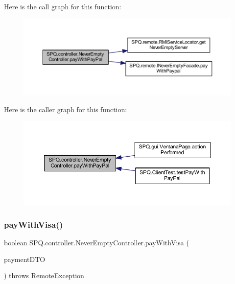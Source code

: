 Here is the call graph for this function\+:\nopagebreak
\begin{figure}[H]
\begin{center}
\leavevmode
\includegraphics[width=350pt]{class_s_p_q_1_1controller_1_1_never_empty_controller_aefc0dae2c43c2960719176d390f3ad9c_cgraph}
\end{center}
\end{figure}
Here is the caller graph for this function\+:\nopagebreak
\begin{figure}[H]
\begin{center}
\leavevmode
\includegraphics[width=350pt]{class_s_p_q_1_1controller_1_1_never_empty_controller_aefc0dae2c43c2960719176d390f3ad9c_icgraph}
\end{center}
\end{figure}
\mbox{\label{class_s_p_q_1_1controller_1_1_never_empty_controller_a79b4d6042b76ad3aee7f11d104d813d6}} 
\subsubsection{\texorpdfstring{pay\+With\+Visa()}{payWithVisa()}}
{\footnotesize\ttfamily boolean S\+P\+Q.\+controller.\+Never\+Empty\+Controller.\+pay\+With\+Visa (\begin{DoxyParamCaption}\item[{\mbox{\hyperlink{class_s_p_q_1_1dto_1_1_payment_d_t_o}{Payment\+D\+TO}}}]{payment\+D\+TO }\end{DoxyParamCaption}) throws Remote\+Exception}

